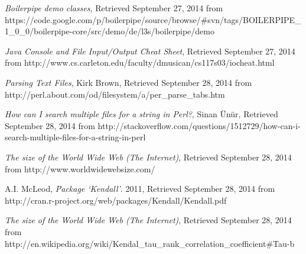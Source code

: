 \documentclass[12pt]{scrartcl} %
\begin{document}
\newpage
\begin{thebibliography}{}

  \emph{Boilerpipe demo classes},
 Retrieved September 27, 2014 from
https://code.google.com/p/boilerpipe/source/browse/\#svn/tags/BOILERPIPE\_1\_0\_0/boilerpipe-core/src/demo/de/l3s/boilerpipe/demo

  \emph{Java Console and File Input/Output Cheat Sheet},
 Retrieved September 27, 2014 from
http://www.cs.carleton.edu/faculty/dmusican/cs117s03/iocheat.html

  \emph{Parsing Text Files},
Kirk Brown,
 Retrieved September 28, 2014 from
http://perl.about.com/od/filesystem/a/per\_parse\_tabs.htm

  \emph{How can I search multiple files for a string in Perl?},
Sinan Ünür,
 Retrieved September 28, 2014 from
http://stackoverflow.com/questions/1512729/how-can-i-search-multiple-files-for-a-string-in-perl  

  \emph{The size of the World Wide Web (The Internet)},
 Retrieved September 28, 2014 from
http://www.worldwidewebsize.com/

A.I. McLeod,
  \emph{Package `Kendall’}.
2011,
 Retrieved September 28, 2014 from
http://cran.r-project.org/web/packages/Kendall/Kendall.pdf

  \emph{The size of the World Wide Web (The Internet)},
 Retrieved September 28, 2014 from
http://en.wikipedia.org/wiki/Kendal\_tau\_rank\_correlation\_coefficient\#Tau-b
\end{thebibliography}
\end{document}
